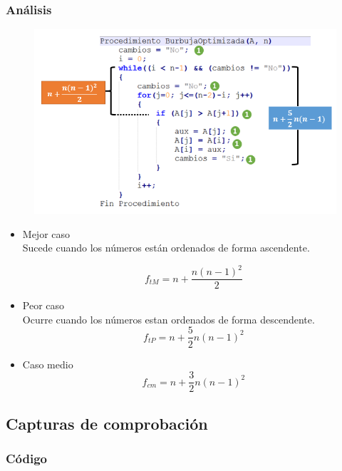 \documentclass[12pt]{article}
\begin{document}
	        \subsubsection{Análisis}

		        \begin{figure}[h!]
	                \centering
	                \includegraphics[width=\textwidth]{Abigail/Images/EJER12.PNG}
	 		    \end{figure} 

	    		\begin{itemize}
	    			\item[\Checklist] Mejor caso \\
	    			Sucede cuando los números están ordenados de forma ascendente.

	    			$$
	    				f_{tM} = n + \frac{n(n-1)^{2}}{2}
	    			$$
	    			\item[\Checklist] Peor caso \\
					Ocurre cuando los números estan ordenados de forma descendente.
	    			$$
	    				f_{tP} = n + \frac{5}{2}n(n-1)^{2}
	    			$$

					\item[\Checklist] Caso medio \\
					$$
						f_{cm} = n + \frac{3}{2}n(n-1)^{2}
					$$
				\end{itemize}
	        \subsection{Capturas de comprobación}

	        \subsubsection{Código}
	            \begin{lstlisting}[style=Java]
    		    \end{lstlisting}
\end{document}
